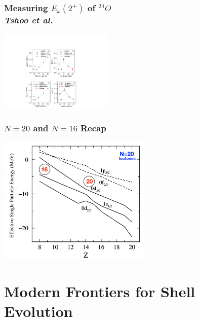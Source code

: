 \documentclass[accentcolor=tud2c,usenames,dvipsnames,colorbacktitle,inverttitle,landscape,german,presentation,t]{tudbeamer}
\begin{document}
  \begin{frame}
    \frametitle{Measuring $E_x(2^+)$ of $^{24}O$ \\ \small{\textit{Tshoo et al.}}}
    \begin{center}
      \includegraphics[trim={0 0 7cm 0},clip,width=0.41\textwidth]{images/tshoo4}
      \\ \small{\cite{Tshoo:2012bi}}
    \end{center}
  \end{frame}

  \begin{frame}
    \frametitle{$N=20$ and $N=16$ Recap}
    \begin{center}
      \includegraphics[trim={1.4cm 0 0 0},clip,width=0.55\textwidth]{images/utsuno_edited}
      \\ \small{\cite{Utsuno:1999st}}
    \end{center}
  \end{frame}

\section{Modern Frontiers for Shell Evolution}
\end{document}
